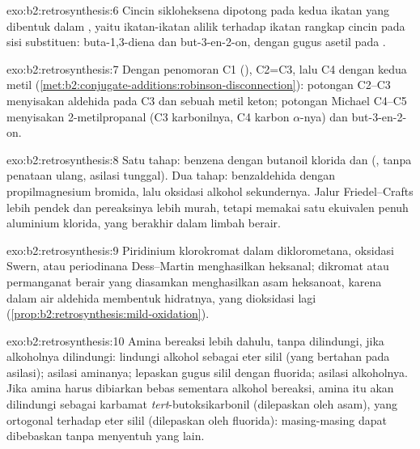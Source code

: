 \begin{solution}{exo:b2:retrosynthesis:6}
Cincin sikloheksena dipotong pada kedua ikatan  yang dibentuk dalam
, yaitu ikatan-ikatan alilik terhadap ikatan rangkap
cincin pada sisi substituen: buta-1,3-diena dan but-3-en-2-on, dengan gugus
asetil pada .
\end{solution}

\begin{solution}{exo:b2:retrosynthesis:7}
Dengan penomoran C1 (), C2=C3, lalu C4 dengan kedua metil
(\cref{met:b2:conjugate-additions:robinson-disconnection}): potongan 
C2--C3 menyisakan aldehida pada C3 dan sebuah metil keton; potongan Michael
C4--C5 menyisakan 2-metilpropanal (C3 karbonilnya, C4 karbon
$\alpha$-nya) dan but-3-en-2-on.
\end{solution}

\begin{solution}{exo:b2:retrosynthesis:8}
Satu tahap: benzena dengan butanoil klorida dan  (, tanpa penataan ulang, asilasi tunggal). Dua tahap:
benzaldehida dengan propilmagnesium bromida, lalu oksidasi alkohol
sekundernya. Jalur Friedel--Crafts lebih pendek dan pereaksinya lebih murah,
tetapi memakai satu ekuivalen penuh aluminium klorida, yang berakhir dalam
limbah berair.
\end{solution}

\begin{solution}{exo:b2:retrosynthesis:9}
Piridinium klorokromat dalam diklorometana, oksidasi Swern, atau periodinana
Dess--Martin menghasilkan heksanal; dikromat atau permanganat berair yang
diasamkan menghasilkan asam heksanoat, karena dalam air aldehida membentuk
hidratnya, yang dioksidasi lagi (\cref{prop:b2:retrosynthesis:mild-oxidation}).
\end{solution}

\begin{solution}{exo:b2:retrosynthesis:10}
Amina bereaksi lebih dahulu, tanpa dilindungi, jika alkoholnya dilindungi:
lindungi alkohol sebagai eter silil (yang bertahan pada asilasi); asilasi
aminanya; lepaskan gugus silil dengan fluorida; asilasi alkoholnya. Jika
amina harus dibiarkan bebas sementara alkohol bereaksi, amina itu akan
dilindungi sebagai karbamat \textit{tert}-butoksikarbonil (dilepaskan oleh
asam), yang ortogonal terhadap eter silil (dilepaskan oleh fluorida):
masing-masing dapat dibebaskan tanpa menyentuh yang lain.
\end{solution}

